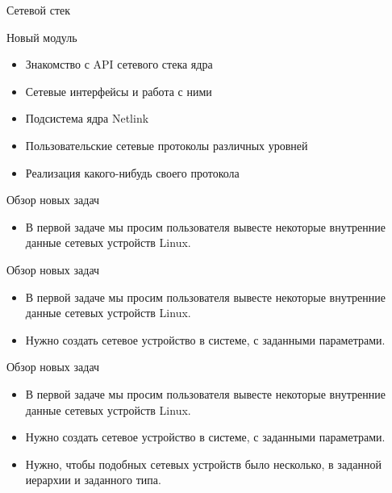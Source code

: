 \documentclass{beamer}
\begin{document}
\begin{frame}{Сетевой стек}
\end{frame}

\begin{frame}{Новый модуль}
	\begin{itemize}
		\item Знакомство с API сетевого стека ядра
		\item Сетевые интерфейсы и работа с ними
		\item Подсистема ядра Netlink
		\item Пользовательские сетевые протоколы различных уровней
		\item Реализация какого-нибудь своего протокола
	\end{itemize}
\end{frame}

\begin{frame}{Обзор новых задач}
	\begin{itemize}
		\item В первой задаче мы просим пользователя вывесте некоторые внутренние данные сетевых устройств Linux.
	\end{itemize}
\end{frame}


\begin{frame}{Обзор новых задач}
	\begin{itemize}
		\item В первой задаче мы просим пользователя вывесте некоторые внутренние данные сетевых устройств Linux.
		\item Нужно создать сетевое устройство в системе, с заданными параметрами.
	\end{itemize}
\end{frame}

\begin{frame}{Обзор новых задач}
	\begin{itemize}
		\item В первой задаче мы просим пользователя вывесте некоторые внутренние данные сетевых устройств Linux.
		\item Нужно создать сетевое устройство в системе, с заданными параметрами.
		\item Нужно, чтобы подобных сетевых устройств было несколько, в заданной иерархии и заданного типа.
	\end{itemize}
\end{frame}
\end{document}
